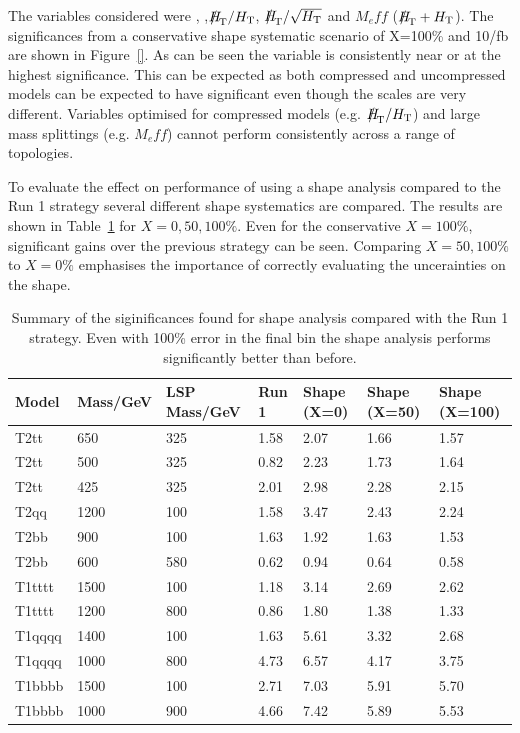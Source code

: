 The variables considered were \alphat, \mht,$\mht/\scalht$, $\mht/\sqrt{\scalht}$ and 
$M_eff$ ($\mht+\scalht$). The significances from a conservative shape systematic 
scenario of X=100\% and 10/fb are shown in Figure~\ref{}. 
As can be seen the \mht variable is consistently near or at the highest 
significance. This can be expected as both compressed and uncompressed models can be expected 
to have significant \mht even though the \scalht scales are very different. Variables optimised
for compressed models (e.g. $\mht/\scalht$) and large mass splittings (e.g. $M_eff$) cannot perform consistently
across a range of topologies.

To evaluate the effect on performance of using a shape analysis compared to the
Run 1 strategy several different shape systematics are compared. The results 
are shown in Table~\ref{table:syst} for $X = 0,50,100\%$. Even for the conservative
$X=100\%$, significant gains over the previous strategy can be seen. Comparing
$X=50,100\%$ to $X=0\%$ emphasises the importance of correctly evaluating the 
uncerainties on the shape.

\begin{table}[!h]
  \label{table:syst}
  \caption{Summary of the siginificances found for shape analysis compared
    with the Run 1 strategy. Even with 100\% error in the final bin
  the shape analysis performs significantly better than before.}
  \centering
  \footnotesize
  \begin{tabular}{ l | l | l | l | l | l | l }
    Model & Mass/GeV & LSP Mass/GeV & Run 1 & Shape (X=0) & Shape (X=50) & Shape (X=100) \\ \hline
    T2tt & 650 & 325 & 1.58 & 2.07& 1.66 & 1.57 \\ 
    T2tt & 500 & 325 & 0.82 & 2.23 & 1.73 & 1.64 \\ 
    T2tt & 425 & 325 & 2.01 & 2.98 & 2.28 & 2.15 \\ 
    T2qq & 1200 & 100 & 1.58 & 3.47 & 2.43 & 2.24 \\ 
    T2bb & 900 & 100 & 1.63 & 1.92 & 1.63 & 1.53 \\ 
    T2bb & 600 & 580 & 0.62 & 0.94 & 0.64 & 0.58 \\ 
    T1tttt & 1500 & 100 & 1.18 & 3.14 & 2.69 & 2.62 \\ 
    T1tttt & 1200 & 800 & 0.86 & 1.80& 1.38 & 1.33 \\ 
    T1qqqq & 1400 & 100 & 1.63 & 5.61 & 3.32 & 2.68 \\ 
    T1qqqq & 1000 & 800 & 4.73 & 6.57 & 4.17 & 3.75 \\ 
    T1bbbb & 1500 & 100 & 2.71 & 7.03 & 5.91 & 5.70 \\ 
    T1bbbb & 1000 & 900 & 4.66 & 7.42 & 5.89 & 5.53 \\ 
  \end{tabular}
\end{table}

